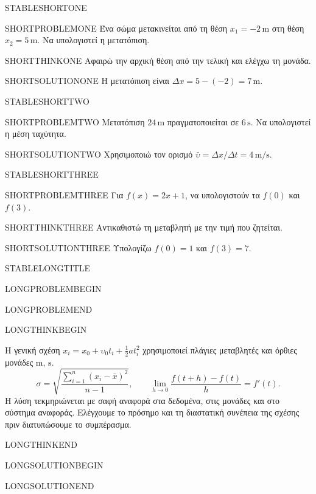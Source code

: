 \newcommand{\StableProofParagraph}{Η λύση τεκμηριώνεται με σαφή αναφορά
  στα δεδομένα, στις μονάδες και στο σύστημα αναφοράς. Ελέγχουμε το πρόσημο
  και τη διαστατική συνέπεια της σχέσης πριν διατυπώσουμε το συμπέρασμα.\par}
\mainmatter\setcounter{chapter}{1}
\begin{workedexample}{STABLESHORTONE}
\begin{ProblemBox}
SHORTPROBLEMONE Ένα σώμα μετακινείται από τη θέση $x_1=-2\,\mathrm m$
στη θέση $x_2=5\,\mathrm m$. Να υπολογιστεί η μετατόπιση.
\end{ProblemBox}
\begin{ThinkBox}
SHORTTHINKONE Αφαιρώ την αρχική θέση από την τελική και ελέγχω τη μονάδα.
\end{ThinkBox}
\SolutionHeading
SHORTSOLUTIONONE Η μετατόπιση είναι $\Delta x=5-(-2)=7\,\mathrm m$.
\end{workedexample}
\begin{workedexample}{STABLESHORTTWO}
\begin{ProblemBox}
SHORTPROBLEMTWO Μετατόπιση $24\,\mathrm m$ πραγματοποιείται σε
$6\,\mathrm s$. Να υπολογιστεί η μέση ταχύτητα.
\end{ProblemBox}
\SolutionHeading
SHORTSOLUTIONTWO Χρησιμοποιώ τον ορισμό
$\bar\upsilon=\Delta x/\Delta t=4\,\mathrm{m/s}$.
\end{workedexample}
\begin{workedexample}{STABLESHORTTHREE}
\begin{ProblemBox}
SHORTPROBLEMTHREE Για $f(x)=2x+1$, να υπολογιστούν τα $f(0)$ και $f(3)$.
\end{ProblemBox}
\begin{ThinkBox}
SHORTTHINKTHREE Αντικαθιστώ τη μεταβλητή με την τιμή που ζητείται.
\end{ThinkBox}
\SolutionHeading
SHORTSOLUTIONTHREE Υπολογίζω $f(0)=1$ και $f(3)=7$.
\end{workedexample}
\clearpage
{}
\begin{workedexample}{STABLELONGTITLE}
\begin{ProblemBox}
LONGPROBLEMBEGIN\par

LONGPROBLEMEND
\end{ProblemBox}
\begin{ThinkBox}
LONGTHINKBEGIN\par
Η γενική σχέση $x_i=x_0+\upsilon_0t_i+\tfrac12at_i^2$ χρησιμοποιεί
πλάγιες μεταβλητές και όρθιες μονάδες $\mathrm m$, $\mathrm s$.
\[
\sigma=\sqrt{\frac{\sum_{i=1}^{n}(x_i-\bar x)^2}{n-1}},\qquad
\lim_{h\to0}\frac{f(t+h)-f(t)}h=f'(t).
\]
\StableProofParagraph
LONGTHINKEND
\end{ThinkBox}
\SolutionHeading
LONGSOLUTIONBEGIN\par

LONGSOLUTIONEND
\end{workedexample}

